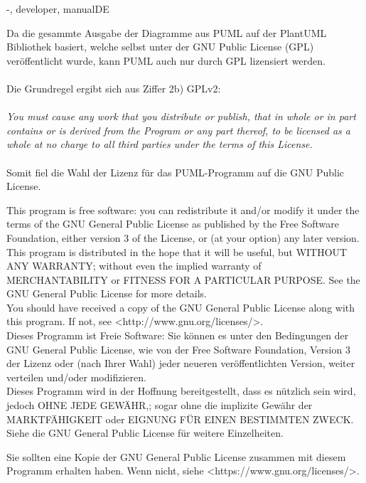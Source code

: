 \documentclass[twoside]{report}
\begin{document}
\begin{shownto}{-, developer, manualDE}


Da die gesammte Ausgabe der Diagramme aus PUML auf der PlantUML Bibliothek basiert, welche selbst unter der GNU Public License (GPL) veröffentlicht wurde, kann PUML auch nur durch GPL lizensiert werden.
\\\\
Die Grundregel ergibt sich aus Ziffer 2b) GPLv2:
\\\\
\textit{You must cause any work that you distribute or publish, that in whole or in part contains or is derived from the Program or any part thereof, to be licensed as a whole at no charge to all third parties under the terms of this License.
}\\\\
Somit fiel die Wahl der Lizenz für das PUML-Programm auf die GNU Public License.
\nsecend

This program is free software: you can redistribute it and/or modify
it under the terms of the GNU General Public License as published by
the Free Software Foundation, either version 3 of the License, or
(at your option) any later version.
\\
This program is distributed in the hope that it will be useful,
but WITHOUT ANY WARRANTY; without even the implied warranty of
MERCHANTABILITY or FITNESS FOR A PARTICULAR PURPOSE.  See the
GNU General Public License for more details.
\\
You should have received a copy of the GNU General Public License
along with this program.  If not, see <http://www.gnu.org/licenses/>.
\\
Dieses Programm ist Freie Software: Sie können es unter den Bedingungen
der GNU General Public License, wie von der Free Software Foundation,
Version 3 der Lizenz oder (nach Ihrer Wahl) jeder neueren
veröffentlichten Version, weiter verteilen und/oder modifizieren.
\\
Dieses Programm wird in der Hoffnung bereitgestellt, dass es nützlich sein wird, jedoch
OHNE JEDE GEWÄHR,; sogar ohne die implizite
Gewähr der MARKTFÄHIGKEIT oder EIGNUNG FÜR EINEN BESTIMMTEN ZWECK.
Siehe die GNU General Public License für weitere Einzelheiten.

Sie sollten eine Kopie der GNU General Public License zusammen mit diesem
Programm erhalten haben. Wenn nicht, siehe <https://www.gnu.org/licenses/>.
\nsecend
\nsecend %
\nsecend %



\end{shownto}
\end{document}
